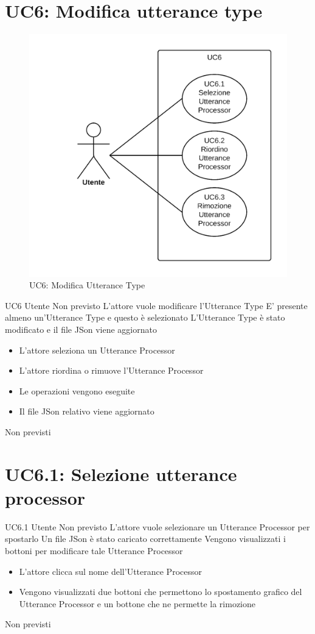\documentclass[../AnalisideiRequisiti.tex]{subfiles}
\begin{document}
\section{UC6: Modifica utterance type}
\begin{figure}[H]
	\centering
	\includegraphics[width=\textwidth]{../img/UC6.png}
	\caption{UC6: Modifica Utterance Type}
\end{figure}
\UserCase
{UC6}
{Utente}
{Non previsto}
{L'attore vuole modificare l'Utterance Type}
{E' presente almeno un'Utterance Type e questo è selezionato }
{L'Utterance Type è stato modificato e il file JSon viene aggiornato}
{
	\begin{itemize}
		\item{} L'attore seleziona un Utterance Processor
		\item{} L'attore riordina o rimuove l'Utterance Processor	
		\item{} Le operazioni vengono eseguite	
		\item{} Il file JSon relativo viene aggiornato		
	\end{itemize}
}
{Non previsti}

\section{UC6.1: Selezione utterance processor}
\UserCase
{UC6.1}
{Utente}
{Non previsto}
{L'attore vuole selezionare un Utterance Processor per spostarlo}
{Un file JSon è stato caricato correttamente }
{Vengono visualizzati i bottoni per modificare tale Utterance Processor}
{
	\begin{itemize}
		\item{} L'attore clicca sul nome dell'Utterance Processor
		\item{} Vengono visualizzati due bottoni che permettono lo spostamento grafico del Utterance Processor  e un bottone che ne permette la rimozione  		
	\end{itemize}
}
{Non previsti}
\end{document}
